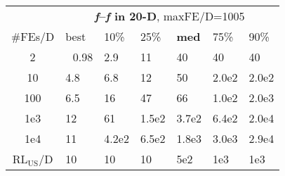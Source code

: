 \begin{tabular}{c|llllll}
 & \multicolumn{6}{|c}{\textbf{\textit{f}\raisebox{-0.35ex}{1}--\textit{f}\raisebox{-0.35ex}{24} in 20-D}, maxFE/D=1005}\\
\#FEs/D & best & 10\% & 25\% & \textbf{med} & 75\% & 90\%\\
2 & ~\,0.98 & \hspace*{1ex}2.9 & 11 & 40 & 40 & 40\\
10 & \hspace*{1ex}4.8 & \hspace*{1ex}6.8 & 12 & 50 & 2.0e2 & 2.0e2\\
100 & \hspace*{1ex}6.5 & 16 & 47 & 66 & 1.0e2 & 2.0e3\\
1e3 & 12 & 61 & 1.5e2 & 3.7e2 & 6.4e2 & 2.0e4\\
1e4 & 11 & 4.2e2 & 6.5e2 & 1.8e3 & 3.0e3 & 2.9e4\\
$\text{RL}_{\text{US}}$/D & 10 & 10 & 10 & 5e2 & 1e3 & 1e3
\end{tabular}

